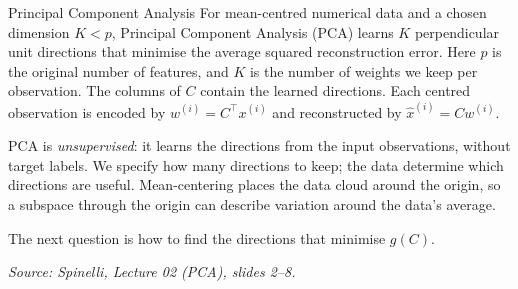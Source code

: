 \begin{frameddefn}{Principal Component Analysis}\label{def:pca}
For mean-centred numerical data and a chosen dimension $K<p$,
Principal Component Analysis (PCA) learns $K$ perpendicular unit
directions that minimise the average squared reconstruction error.
Here $p$ is the original number of features, and $K$ is the number
of weights we keep per observation. The columns of $C$ contain the
learned directions. Each centred observation is encoded by
$w^{(i)}=C^\top x^{(i)}$ and reconstructed by $\hat{x}^{(i)}=Cw^{(i)}$.
\end{frameddefn}

PCA is \emph{unsupervised}: it learns the directions from the input
observations, without target labels. We specify how many directions to
keep; the data determine which directions are useful. Mean-centering
places the data cloud around the origin, so a subspace through the
origin can describe variation around the data's average.

The next question is how to find the directions that minimise $g(C)$.

\medskip
{\small\textit{Source: Spinelli, Lecture 02 (PCA), slides 2--8.}}
